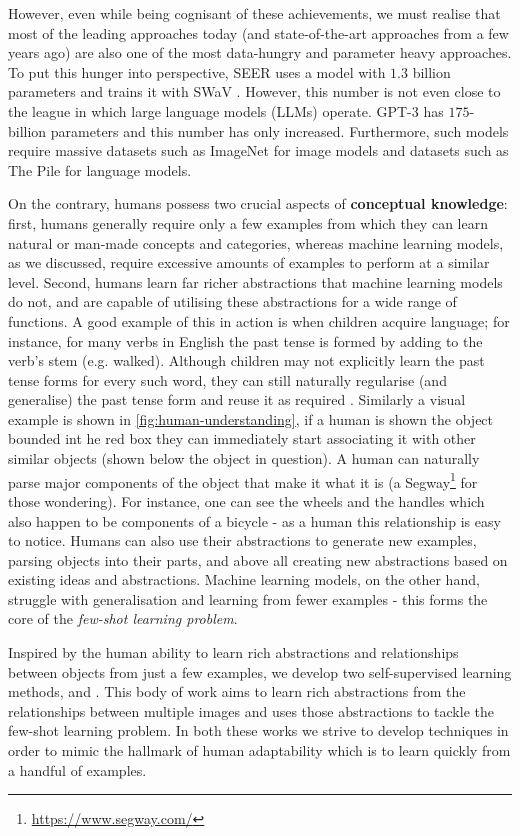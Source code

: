 However, even while being cognisant of these achievements, we must realise that most of the leading approaches today (and state-of-the-art approaches from a few years ago) are also one of the most data-hungry and parameter heavy approaches. To put this hunger into perspective, SEER \parencite{Goyal2021} uses a model with $1.3$ billion parameters and trains it with SWaV \parencite{caron2020unsupervised}. However, this number is not even close to the league in which large language models (LLMs) operate. GPT-3 \parencite{brown2020language} has $175$-billion parameters and this number has only increased. Furthermore, such models require massive datasets such as ImageNet \parencite{deng2009imagenet} for image models and datasets such as The Pile \parencite{gao2020pile} for language models.

On the contrary, humans possess two crucial aspects of \textbf{conceptual knowledge}: first, humans generally require only a few examples from which they can learn natural or man-made concepts and categories, whereas machine learning models, as we discussed, require excessive amounts of examples to perform at a similar level.
Second, humans learn far richer abstractions that machine learning models do not, and are capable of utilising these abstractions for a wide range of functions. A good example of this in action is when children acquire language; for instance, for many verbs in English the past tense is formed by adding  to the verb's stem (e.g. walked). Although children may not explicitly learn the past tense forms for every such word, they can still naturally regularise (and generalise) the past tense form and reuse it as required \parencite{marcus1992overregularization}.
Similarly a visual example is shown in \cref{fig:human-understanding}, if a human is shown the object bounded int he red box they can immediately start associating it with other similar objects (shown below the object in question). A human can naturally parse major components of the object that make it what it is (a Segway\footnote{\url{https://www.segway.com/}} for those wondering). For instance, one can see the wheels and the handles which also happen to be components of a bicycle - as a human this relationship is easy to notice.
Humans can also use their abstractions to generate new examples, parsing objects into their parts, and above all creating new abstractions based on existing ideas and abstractions. Machine learning models, on the other hand, struggle with generalisation and learning from fewer examples - this forms the core of the \textit{few-shot learning problem}.

Inspired by the human ability to learn rich abstractions and relationships between objects from just a few examples, we develop two self-supervised learning methods, \ccclr{} and \samptr{}. This body of work aims to 
learn rich abstractions from the relationships between multiple images and uses those abstractions to tackle the few-shot learning problem.
In both these works we strive to develop techniques in order to mimic the hallmark of human adaptability which is to learn quickly from a handful of examples.

